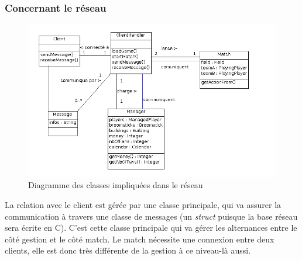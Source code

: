 \documentclass[a4paper,titlepage]{scrreprt}
\begin{document}
\begin{itemize}
  \subsubsection{Concernant le réseau}
    \begin{figure}[H]
    \center
    \includegraphics[scale=0.5]{uml/class/Diagrammedeclasses.png}
    \caption{Diagramme des classes impliquées dans le réseau}
    \end{figure}	
    La relation avec le client est gérée par une classe principale, qui va assurer la communication
    à travers une classe de messages (un \emph{struct} puisque la base réseau sera écrite en C).
    C'est cette classe principale qui va gérer les alternances entre le côté gestion et le côté match. Le match nécessite une connexion entre deux clients, elle est donc très différente de la gestion
    à ce niveau-là aussi.

\end{itemize}
\end{document}
